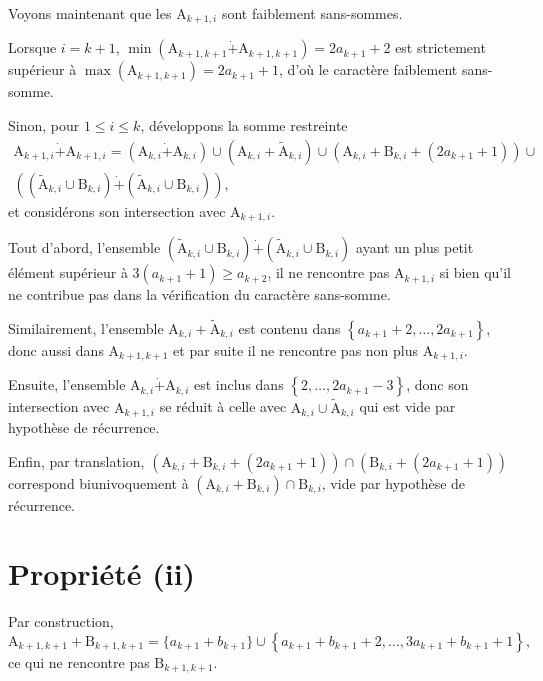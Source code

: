 \documentclass[11pt, oneside]{article}   	%
\newcommand{\interval}[2]{\left\{ #1, \dots, #2 \right\}}
\begin{document}
Voyons maintenant que les $\mathrm{A}_{k+1, i}$ sont faiblement sans-sommes.

Lorsque $i = k + 1$, $\min(\mathrm{A}_{k+1, k+1} \dot{+} \mathrm{A}_{k+1, k+1}) = 2 a_{k + 1} + 2$
est strictement supérieur à $\max(\mathrm{A}_{k+1, k+1}) = 2 a_{k + 1} + 1$, d'où le caractère faiblement sans-somme.

Sinon, pour $1 \leqslant i \leqslant k$, développons la somme restreinte
\begin{multline}
 \mathrm{A}_{k+1, i} \dot{+} \mathrm{A}_{k+1, i} =
 (\mathrm{A}_{k, i} \dot{+} \mathrm{A}_{k, i}) \cup (\mathrm{A}_{k, i} + \widetilde{\mathrm{A}}_{k, i}) \cup
 (\mathrm{A}_{k, i} + \mathrm{B}_{k, i} + (2 a_{k+1} + 1)) \cup \\
 ((\widetilde{\mathrm{A}}_{k, i} \cup \mathrm{B}_{k, i}) \dot{+} (\widetilde{\mathrm{A}}_{k, i} \cup \mathrm{B}_{k, i})),
\end{multline}
et considérons son intersection avec $\mathrm{A}_{k+1, i}$.

Tout d'abord, l'ensemble $(\widetilde{\mathrm{A}}_{k, i} \cup \mathrm{B}_{k, i}) \dot{+} (\widetilde{\mathrm{A}}_{k, i} \cup \mathrm{B}_{k, i})$
ayant un plus petit élément supérieur à $3 (a_{k + 1} + 1) \geqslant a_{k + 2}$, il ne rencontre pas $\mathrm{A}_{k+1, i}$
si bien qu'il ne contribue pas dans la vérification du caractère sans-somme.

Similairement, l'ensemble $\mathrm{A}_{k, i} + \widetilde{\mathrm{A}}_{k, i}$ est contenu dans $\interval{a_{k+1} + 2}{2 a_{k+1}}$,
donc aussi dans $\mathrm{A}_{k+1, k+1}$ et par suite il ne rencontre pas non plus $\mathrm{A}_{k+1, i}$.

Ensuite, l'ensemble $\mathrm{A}_{k, i} \dot{+} \mathrm{A}_{k, i}$ est inclus dans $\interval{2}{2 a_{k + 1} - 3}$,
donc son intersection avec $\mathrm{A}_{k+1, i}$ se réduit à celle avec $\mathrm{A}_{k, i} \cup \widetilde{\mathrm{A}}_{k, i}$
qui est vide par hypothèse de récurrence.

Enfin, par translation, $(\mathrm{A}_{k, i} + \mathrm{B}_{k, i} + (2 a_{k+1} + 1)) \cap (\mathrm{B}_{k, i} + (2 a_{k+1} + 1))$
correspond biunivoquement à $(\mathrm{A}_{k, i} + \mathrm{B}_{k, i}) \cap \mathrm{B}_{k, i}$, vide par hypothèse de récurrence.

\section{Propriété (ii)}

Par construction,
\begin{equation}
 \mathrm{A}_{k + 1, k + 1} + \mathrm{B}_{k + 1, k + 1} = \{a_{k+1} + b_{k+1}\} \cup \interval{a_{k+1} + b_{k+1} + 2}{3 a_{k+1} + b_{k+1} + 1},
\end{equation}
ce qui ne rencontre pas $\mathrm{B}_{k + 1, k + 1}$.
\end{document}
